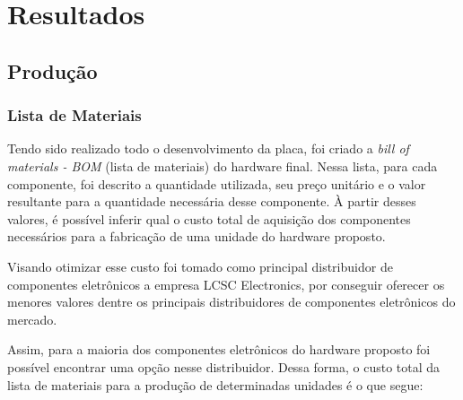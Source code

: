 \chapter{Resultados}
\label{chap:resultados}


\section{Produção}

\subsection{Lista de Materiais}

Tendo sido realizado todo o desenvolvimento da placa, foi criado a \textit{bill of materials - BOM} (lista de materiais) do hardware final. Nessa lista, para cada componente, foi descrito a quantidade utilizada, seu preço unitário e o valor resultante para a quantidade necessária desse componente. À partir desses valores, é possível inferir qual o custo total de aquisição dos componentes necessários para a fabricação de uma unidade do hardware proposto. 

Visando otimizar esse custo foi tomado como principal distribuidor de componentes eletrônicos a empresa LCSC Electronics, por conseguir oferecer os menores valores dentre os principais distribuidores de componentes eletrônicos do mercado. 

Assim, para a maioria dos componentes eletrônicos do hardware proposto foi possível encontrar uma opção nesse distribuidor. Dessa forma, o custo total da lista de materiais para a produção de determinadas unidades é o que segue:

	\begin{table}[!h]
	\captionsetup{width=7cm}%
    \end{table}





